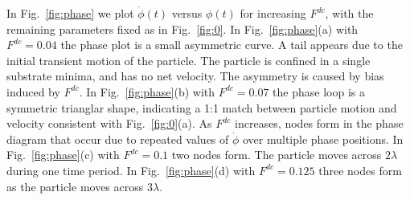 \documentclass[twocolumn,preprintnumbers,amsmath,amssymb,aps,prx]{revtex4}
\begin{document}
  In Fig.~\ref{fig:phase}
  we plot $\dot{\phi}(t)$ versus $\phi(t)$
  for increasing %
  $F^{dc}$, %
  with the remaining parameters fixed as in Fig.~\ref{fig:0}.
  In Fig.~\ref{fig:phase}(a) with
  $F^{dc} = 0.04$
  the phase plot is a small asymmetric curve.
  A tail appears
  due to the initial transient
  motion of the particle.
  The particle is confined in a single
  substrate minima,
  and has no net velocity.
  The asymmetry is caused by bias induced by $F^{dc}$.
  In Fig.~\ref{fig:phase}(b)
  with $F^{dc} = 0.07$
  the phase loop is a symmetric trianglar shape,
  indicating a 1:1 match between
  particle motion and velocity consistent with 
  Fig.~\ref{fig:0}(a).
  As $F^{dc}$ %
  increases,
  nodes form in the phase diagram
  that occur due to repeated values
  of $\dot{\phi}$ over multiple phase positions.
  In Fig.~\ref{fig:phase}(c)
  with $F^{dc} = 0.1$
  two nodes form.
  The particle moves across $2\lambda$
  during one time period.
  In Fig.~\ref{fig:phase}(d)
  with $F^{dc} = 0.125$
  three nodes form as the particle moves across $3\lambda$.
\end{document}
